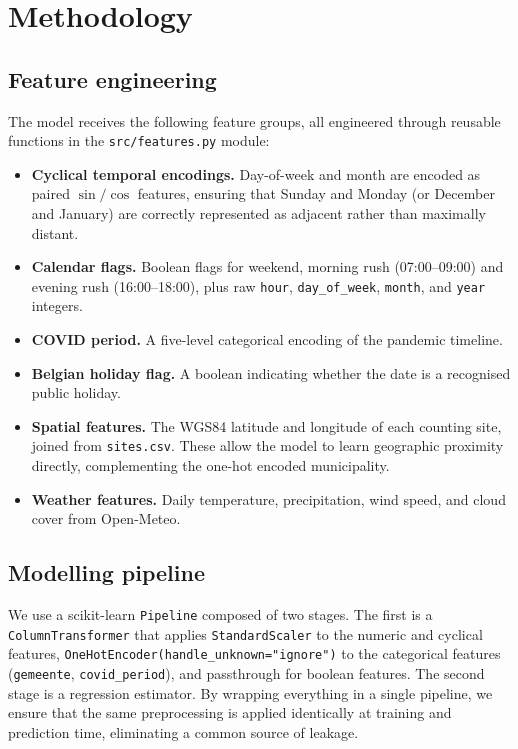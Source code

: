 \documentclass[11pt,a4paper]{article}
\begin{document}
\section{Methodology}
\label{sec:method}

\subsection{Feature engineering}

The model receives the following feature groups, all engineered through
reusable functions in the \texttt{src/features.py} module:

\begin{itemize}[leftmargin=*]
  \item \textbf{Cyclical temporal encodings.} Day-of-week and month are
  encoded as paired $\sin/\cos$ features, ensuring that Sunday and
  Monday (or December and January) are correctly represented as
  adjacent rather than maximally distant.
  \item \textbf{Calendar flags.} Boolean flags for weekend, morning
  rush (07:00--09:00) and evening rush (16:00--18:00), plus raw
  \texttt{hour}, \texttt{day\_of\_week}, \texttt{month}, and
  \texttt{year} integers.
  \item \textbf{COVID period.} A five-level categorical encoding of
  the pandemic timeline.
  \item \textbf{Belgian holiday flag.} A boolean indicating whether
  the date is a recognised public holiday.
  \item \textbf{Spatial features.} The WGS84 latitude and longitude of
  each counting site, joined from \texttt{sites.csv}. These allow the
  model to learn geographic proximity directly, complementing the
  one-hot encoded municipality.
  \item \textbf{Weather features.} Daily temperature, precipitation,
  wind speed, and cloud cover from Open-Meteo.
\end{itemize}

\subsection{Modelling pipeline}

We use a scikit-learn \texttt{Pipeline} composed of two stages. The
first is a \texttt{ColumnTransformer} that applies
\texttt{StandardScaler} to the numeric and cyclical features,
\texttt{OneHotEncoder(handle\_unknown="ignore")} to the categorical
features (\texttt{gemeente}, \texttt{covid\_period}), and passthrough
for boolean features. The second stage is a regression estimator. By
wrapping everything in a single pipeline, we ensure that the same
preprocessing is applied identically at training and prediction time,
eliminating a common source of leakage.
\end{document}

